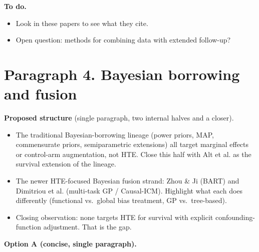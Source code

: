 \textbf{To do.}
\begin{itemize}
  \item Look in these papers to see what they cite.
  \item Open question: methods for combining data with extended follow-up?
\end{itemize}



\newpage
\section*{Paragraph 4. Bayesian borrowing and fusion}

\textbf{Proposed structure} (single paragraph, two internal halves and a closer).
\begin{itemize}
  \item The traditional Bayesian-borrowing lineage (power priors, MAP, commensurate priors, semiparametric extensions) all target marginal effects or control-arm augmentation, not HTE.
        Close this half with Alt et al. as the survival extension of the lineage.
  \item The newer HTE-focused Bayesian fusion strand: Zhou \& Ji (BART) and Dimitriou et al. (multi-task GP / Causal-ICM).
        Highlight what each does differently (functional vs.\ global bias treatment, GP vs.\ tree-based).
  \item Closing observation: none targets HTE for survival with explicit confounding-function adjustment.
        That is the gap.
\end{itemize}

\textbf{Option A (concise, single paragraph).}

